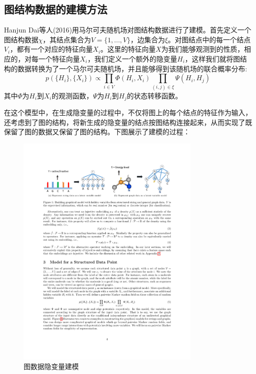 \subsection{图结构数据的建模方法}
Hanjun Dai等人(2016)用马尔可夫随机场对图结构数据进行了建模。首先定义一个图结构数据$\chi$，其结点集合为$\mathit{V}=\{1,...,V\}$，边集合为$\xi$。对图结点中的每一个结点$V_i$，都有一个对应的特征向量$X_i$。这里的特征向量$X$为我们能够观测到的性质，相应的，对每一个特征向量$X_i$，我们定义一个额外的隐变量$H_i$，这样我们就将图结构的数据转换为了一个马尔可夫随机场，并且能够得到该随机场的联合概率分布:
\begin{equation*}
p(\{H_i\}, \{X_i\}) \propto \prod_{i\in V} \Phi(H_i, X_i)\prod_{(i, j)\in \xi} \Psi(H_i, H_j)
\end{equation*}
其中$\Phi$为$H_i$到$X_i$的观测函数，$\Psi$为$H_i$到$H_j$的状态转移函数。
\par 在这个模型中，在生成隐变量的过程中，不仅将图上的每个结点的特征作为输入，还考虑到了图的结构，将新生成的隐变量的结点按图结构连接起来，从而实现了既保留了图的数据又保留了图的结构。下图展示了建模的过程：
\begin{figure}[htbp]
\begin{center}
\includegraphics[width=0.8\textwidth]{figures//1.pdf}
\caption{图数据隐变量建模}
\label{default}
\end{center}
\end{figure}
